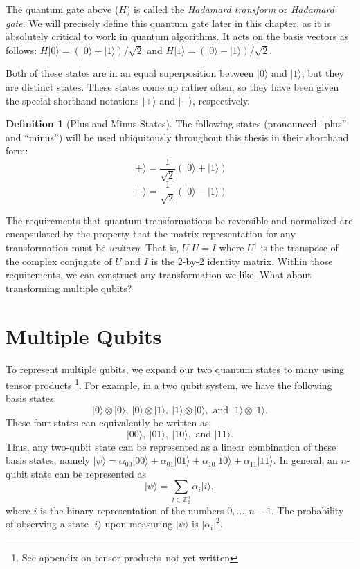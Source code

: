 \documentclass[12pt,twoside]{reedthesis}
\theoremstyle{definition}
\newtheorem{definition}[theorem]{Definition}
\newcommand{\Z}{\mathbb{Z}}
\newcommand{\ketz}{\ensuremath{\lvert 0\rangle}\xspace}
\newcommand{\keto}{\ensuremath{\lvert 1\rangle}\xspace}
\newcommand{\ket}[1]{\ensuremath{\lvert #1\rangle}\xspace}
\newcommand{\Hplus}{\ensuremath{\lvert + \rangle}\xspace}
\newcommand{\Hminus}{\ensuremath{\lvert- \rangle}\xspace}
\begin{document}
The quantum gate above ($H$) is called the \textit{Hadamard transform} or \textit{Hadamard gate}. We will precisely define this quantum gate later in this chapter, as it is absolutely critical to work in quantum algorithms. It acts on the basis vectors as follows: $H\ketz = (\ketz + \keto)/\sqrt{2}$ and $H\keto = (\ketz - \keto)/\sqrt{2}$. 

Both of these states are in an equal superposition between \ketz and \keto, but they are distinct states. These states come up rather often, so they have been given the special shorthand notations \Hplus and \Hminus, respectively. 

\begin{definition}[Plus and Minus States] The following states (pronounced ``plus'' and ``minus'') will be used ubiquitously throughout this thesis in their shorthand form:
$$\Hplus = \frac{1}{\sqrt{2}}(\ketz + \keto)$$
$$\Hminus = \frac{1}{\sqrt{2}}(\ketz - \keto)$$
\end{definition}
The requirements that quantum transformations be reversible and normalized are encapsulated by the property that the matrix representation for any transformation must be \textit{unitary}. That is, $U^{\dagger} U = I$ where $U^{\dagger}$ is the transpose of the complex conjugate of $U$ and $I$ is the 2-by-2 identity matrix. Within those requirements, we can construct any transformation we like. What about transforming multiple qubits?

\section{Multiple Qubits}

To represent multiple qubits, we expand our two quantum states to many using tensor products \footnote{See appendix on tensor products--not yet written}. For example, in a two qubit system, we have the following basis states:
$$ \ketz \otimes \ketz,~\ketz \otimes \keto,~\keto \otimes \ketz, \text{ and } \keto \otimes \keto.$$ 
These four states can equivalently be written as:
$$ \ket{00},~\ket{01},~\ket{10}, \text{ and } \ket{11}.$$
Thus, any two-qubit state can be represented as a linear combination of these basis states, namely $\ket{\psi} = \alpha_{00}\ket{00}+ \alpha_{01}\ket{01} + \alpha_{10}\ket{10} + \alpha_{11}\ket{11}.$ In general, an $n$-qubit state can be represented as 
\begin{equation*}
\ket{\psi} = \sum_{i \in \Z_2^n} \alpha_{i}\ket{i},
\end{equation*}
where $i$ is the binary representation of the numbers $0, \ldots, n-1.$ The probability of observing a state \ket{i} upon measuring \ket{\psi} is $\lvert \alpha_{i} \rvert ^2.$ 
\end{document}
